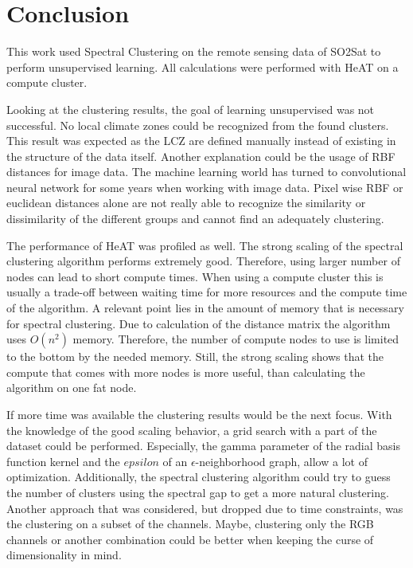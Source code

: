 \section{Conclusion}
\label{sec:conclusion}
This work used Spectral Clustering on the remote sensing data of SO2Sat to perform unsupervised learning.
All calculations were performed with \gls{HeAT} on a compute cluster.

Looking at the clustering results, the goal of learning unsupervised was not successful.
No local climate zones could be recognized from the found clusters.
This result was expected as the \gls{LCZ}  are defined manually instead of existing in the structure of the data itself.
Another explanation could be the usage of RBF distances for image data. The machine learning world has turned to convolutional neural network
for some years when working with image data. Pixel wise RBF or euclidean distances alone are not really able to recognize the similarity or dissimilarity
of the different groups and cannot find an adequately clustering.

The performance of \gls{HeAT} was profiled as well.
The strong scaling of the spectral clustering algorithm performs extremely good.
Therefore, using larger number of nodes can lead to short compute times.
When using a compute cluster this is usually a trade-off between waiting time for more resources and the compute time of the algorithm.
A relevant point lies in the amount of memory that is necessary for spectral clustering. Due to calculation of the distance matrix
the algorithm uses \(O(n^2)\) memory.
Therefore, the number of compute nodes to use is limited to the bottom by the needed memory.
Still, the strong scaling shows that the compute that comes with more nodes is more useful, than calculating the algorithm on one fat node.

If more time was available the clustering results would be the next focus.
With the knowledge of the good scaling behavior, a grid search with a part of the dataset could be performed.
Especially, the gamma parameter of the radial basis function kernel and the \(epsilon\) of an \(\epsilon\)-neighborhood graph, allow a lot of optimization.
Additionally, the spectral clustering algorithm could try to guess the number of clusters using the spectral gap to get a more natural clustering.
Another approach that was considered, but dropped due to time constraints, was the clustering on a subset of the channels.
Maybe, clustering only the RGB channels or another combination could be better when keeping the curse of dimensionality in mind.
